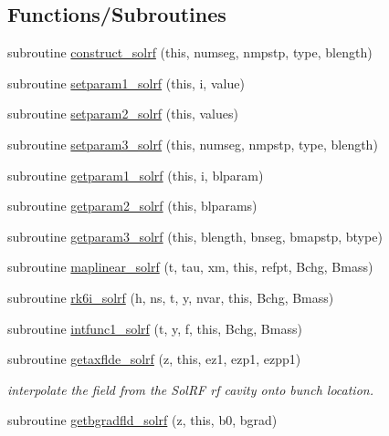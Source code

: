 \subsection*{Functions/\+Subroutines}
\begin{DoxyCompactItemize}
\item 
subroutine \mbox{\hyperlink{namespacesolrfclass_a3d7deb451633bf4e6fc42e0b43f21e2e}{construct\+\_\+solrf}} (this, numseg, nmpstp, type, blength)
\item 
subroutine \mbox{\hyperlink{namespacesolrfclass_ad06b3becdb99ba947f714809bea2af35}{setparam1\+\_\+solrf}} (this, i, value)
\item 
subroutine \mbox{\hyperlink{namespacesolrfclass_a4f5cee7483285ca745064b5331f3c30f}{setparam2\+\_\+solrf}} (this, values)
\item 
subroutine \mbox{\hyperlink{namespacesolrfclass_ae51249f1d976b6ff71436430614a854e}{setparam3\+\_\+solrf}} (this, numseg, nmpstp, type, blength)
\item 
subroutine \mbox{\hyperlink{namespacesolrfclass_af623613497d4af2070e81c255374535e}{getparam1\+\_\+solrf}} (this, i, blparam)
\item 
subroutine \mbox{\hyperlink{namespacesolrfclass_ac8cc63a77159c54d547e156bf816e7d1}{getparam2\+\_\+solrf}} (this, blparams)
\item 
subroutine \mbox{\hyperlink{namespacesolrfclass_abb727d5c5f8ebd6af19e036fe9204923}{getparam3\+\_\+solrf}} (this, blength, bnseg, bmapstp, btype)
\item 
subroutine \mbox{\hyperlink{namespacesolrfclass_a70f5e9afe73a56ed66363e6ca3207226}{maplinear\+\_\+solrf}} (t, tau, xm, this, refpt, Bchg, Bmass)
\item 
subroutine \mbox{\hyperlink{namespacesolrfclass_a47bcede8ab38e0e035ef1be479490018}{rk6i\+\_\+solrf}} (h, ns, t, y, nvar, this, Bchg, Bmass)
\item 
subroutine \mbox{\hyperlink{namespacesolrfclass_aaf806853862c8c4b3f448ca750500178}{intfunc1\+\_\+solrf}} (t, y, f, this, Bchg, Bmass)
\item 
subroutine \mbox{\hyperlink{namespacesolrfclass_a1033b422b682ef72ecc3b482c38b5065}{getaxflde\+\_\+solrf}} (z, this, ez1, ezp1, ezpp1)
\begin{DoxyCompactList}\small\item\em interpolate the field from the Sol\+RF rf cavity onto bunch location. \end{DoxyCompactList}\item 
subroutine \mbox{\hyperlink{namespacesolrfclass_adf7673f885573c8468f07faebc432d7d}{getbgradfld\+\_\+solrf}} (z, this, b0, bgrad)

\end{DoxyCompactItemize}
